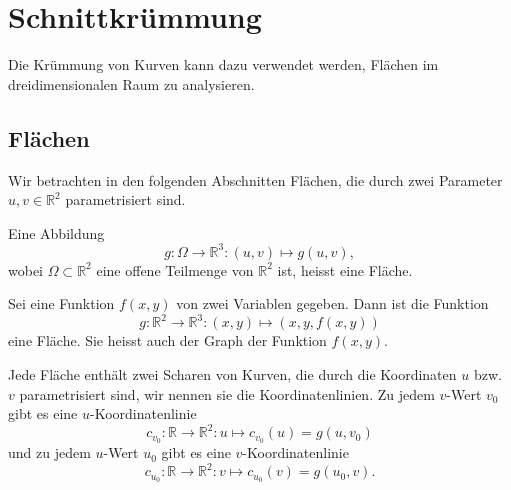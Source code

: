 %
%
%
\section{Schnittkrümmung}
Die Krümmung von Kurven kann dazu verwendet werden, Flächen im
dreidimensionalen Raum zu analysieren.

\subsection{Flächen}
Wir betrachten in den folgenden Abschnitten Flächen, die durch zwei
Parameter $u,v\in\mathbb R^2$ parametrisiert sind.

\begin{definition}
Eine Abbildung
\[
g\colon \Omega\to\mathbb R^3: (u,v)\mapsto g(u,v),
\]
wobei $\Omega\subset\mathbb R^2$
eine offene Teilmenge von $\mathbb R^2$ ist, heisst eine Fläche.
\end{definition}

\begin{beispiel}
Sei eine Funktion $f(x,y)$ von zwei Variablen gegeben.
Dann ist die Funktion
\[
g\colon\mathbb R^2\to \mathbb R^3
: (x,y)\mapsto (x,y,f(x,y))
\]
eine Fläche.
Sie heisst auch der Graph der Funktion $f(x,y)$.
\end{beispiel}

Jede Fläche enthält zwei Scharen von Kurven, die durch die Koordinaten $u$
bzw.~$v$ parametrisiert sind, wir nennen sie die Koordinatenlinien.
Zu jedem $v$-Wert $v_0$ gibt es eine $u$-Koordinatenlinie
\[
c_{v_0}
\colon
\mathbb R \to \mathbb R^2
:
u\mapsto
c_{v_0}(u) = g(u, v_0)
\]
und zu jedem $u$-Wert $u_0$ gibt es eine $v$-Koordinatenlinie
\[
c_{u_0}
\colon
\mathbb R \to \mathbb R^2
:
v\mapsto
c_{u_0}(v) = g(u_0, v).
\]

